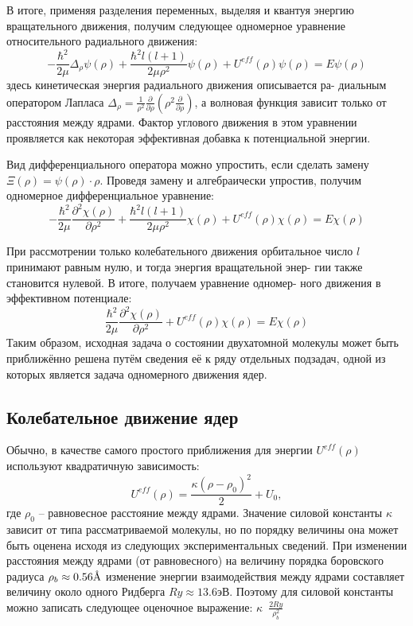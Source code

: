 \documentclass[a4paper, 12pt]{article}
\newcommand{\angstrom}{\textup{\AA}}
\begin{document}
В итоге, применяя разделения переменных, выделяя и квантуя энергию вращательного движения, получим следующее одномерное уравнение относительного радиального движения:
\begin{equation}
	-\frac{\hbar^2}{2\mu}\Delta_\rho\psi(\rho)+\frac{\hbar^2l(l+1)}{2\mu\rho^2}\psi(\rho)+U^{eff}(\rho)\psi(\rho)=E\psi(\rho)
\end{equation}
здесь кинетическая энергия радиального движения описывается ра-
диальным оператором Лапласа $\Delta_\rho=\frac{1}{\rho^2}\frac{\partial}{\partial\rho}(\rho^2\frac{\partial}{\partial\rho})$, а волновая функция зависит только от расстояния между ядрами. Фактор углового
движения в этом уравнении проявляется как некоторая эффективная
добавка к потенциальной энергии.

Вид дифференциального оператора можно упростить, если сделать
замену $\Xi(\rho)=\psi(\rho)\cdot\rho$. Проведя замену и алгебраически упростив,
получим одномерное дифференциальное уравнение:
\begin{equation}
-\frac{\hbar^2}{2\mu}\frac{\partial^2\chi(\rho)}{\partial\rho^2}+\frac{\hbar^2l(l+1)}{2\mu\rho^2}\chi(\rho)+U^{eff}(\rho)\chi(\rho)=E\chi(\rho)
\end{equation}

При рассмотрении только колебательного движения орбитальное
число $l$ принимают равным нулю, и тогда энергия вращательной энер-
гии также становится нулевой. В итоге, получаем уравнение одномер-
ного движения в эффективном потенциале:
\begin{equation}
\frac{\hbar^2}{2\mu}\frac{\partial^2\chi(\rho)}{\partial\rho^2}+U^{eff}(\rho)\chi(\rho)=E\chi(\rho)
\end{equation}
Таким образом, исходная задача о состоянии двухатомной молекулы
может быть приближённо решена путём сведения её к ряду отдельных
подзадач, одной из которых является задача одномерного движения
ядер.
\subsection{Колебательное движение ядер}
Обычно, в качестве самого простого приближения для энергии $U^{eff}(\rho)$ используют квадратичную зависимость:
\begin{equation}
U^{eff}(\rho)=\frac{\kappa(\rho-\rho_0)^2}{2}+U_0,
\end{equation}
где $\rho_0$ -- равновесное расстояние между ядрами. Значение силовой константы $\kappa$ зависит от типа рассматриваемой молекулы, но по порядку величины она может быть оценена исходя из следующих экспериментальных сведений. При изменении расстояния между ядрами (от равновесного) на величину порядка боровского радиуса $\rho_b\approx0.56\angstrom$ изменение энергии взаимодействия между ядрами составляет величину
около одного Ридберга $Ry\approx13.6$эВ. Поэтому для силовой константы
можно записать следующее оценочное выражение: $\kappa$~$\frac{2Ry}{\rho_b^2}$
\end{document}

